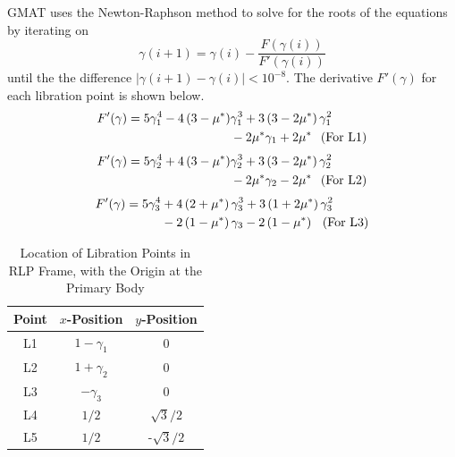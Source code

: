 GMAT uses the Newton-Raphson method to solve for the roots of the
equations by iterating on
%
\begin{equation}
   \gamma(i+1) = \gamma(i) - \frac{F(\gamma(i))}{F'(\gamma(i))}
\end{equation}
%
until the the difference $|\gamma(i+1) - \gamma(i)| < 10^{-8}$. The
derivative $F'(\gamma)$ for each libration point is shown below.
%
\begin{eqnarray}\begin{split}
F'(\gamma) = 5\gamma _1^4  - 4\left( {3 - \mu^*} \right)&\gamma _1^3
+ 3\left( {3 - 2\mu^*} \right)\gamma _1^2\\&  - 2\mu^*\gamma
_1  + 2\mu^*    \hspace{.1 in} \mbox{(For L1)}   \label{Eq:L1Deriv} \\
\end{split}
\end{eqnarray}
%
\begin{eqnarray}\begin{split}
F'(\gamma) = 5\gamma _2^4  + 4\left( {3 - \mu^*} \right)&\gamma_2^3
+ 3\left( {3 - 2\mu^*} \right)\gamma _2^2\\& - 2\mu^*\gamma _2  -
2\mu^* \hspace{.1 in} \mbox{(For L2)}
 \label{Eq:L2Deriv}\end{split}
\end{eqnarray}
%
\begin{eqnarray}\begin{split}
F'(\gamma) = 5\gamma _3^4  &+ 4\left( {2 + \mu^*} \right)\gamma _3^3
+ 3\left( {1 + 2\mu^*} \right)\gamma _3^2\\&  - 2\left( {1 - \mu^*}
\right)\gamma _3  - 2\left( {1 - \mu^*} \right) \hspace{.1 in}
\mbox{(For L3)} \label{Eq:L3Deriv}\end{split}
\end{eqnarray}

\begin{table}[htb]
\centering \caption{Location of Libration Points in RLP Frame, with
the Origin at the Primary Body} 
\begin{tabular}{ccc}
   \hline\hline
  Point & $x$-Position & $y$-Position \\
  \hline
  L1 & $1 - \gamma_1$ & 0 \\
  L2 & $1 + \gamma_2$ & 0 \\
  L3 & $-\gamma_3$ & 0 \\
  L4 & $1/2$ & $\sqrt{3}/2$ \\
  L5 & $1/2$ & -$\sqrt{3}/2$ \\
  \hline
  \end{tabular}
\end{table}

